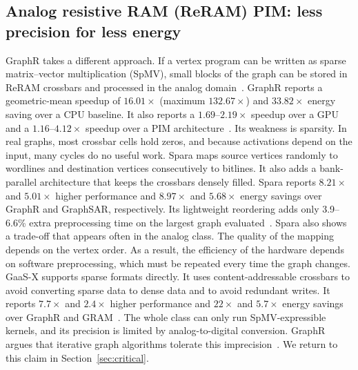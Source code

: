 \documentclass[journal,onecolumn]{IEEEtran}
\begin{document}
\subsection{Analog resistive RAM (ReRAM) PIM: less precision for less energy}
GraphR takes a different approach. If a vertex program can be written as sparse matrix--vector multiplication (SpMV), small blocks of the graph can be stored in ReRAM crossbars and processed in the analog domain~\cite{song2018graphr}. GraphR reports a geometric-mean speedup of $16.01\times$ (maximum $132.67\times$) and $33.82\times$ energy saving over a CPU baseline. It also reports a $1.69$--$2.19\times$ speedup over a GPU and a $1.16$--$4.12\times$ speedup over a PIM architecture~\cite{song2018graphr}. Its weakness is sparsity. In real graphs, most crossbar cells hold zeros, and because activations depend on the input, many cycles do no useful work. Spara maps source vertices randomly to wordlines and destination vertices consecutively to bitlines. It also adds a bank-parallel architecture that keeps the crossbars densely filled. Spara reports $8.21\times$ and $5.01\times$ higher performance and $8.97\times$ and $5.68\times$ energy savings over GraphR and GraphSAR, respectively. Its lightweight reordering adds only 3.9--6.6\% extra preprocessing time on the largest graph evaluated~\cite{zheng2020spara}. Spara also shows a trade-off that appears often in the analog class. The quality of the mapping depends on the vertex order. As a result, the efficiency of the hardware depends on software preprocessing, which must be repeated every time the graph changes. GaaS-X supports sparse formats directly. It uses content-addressable crossbars to avoid converting sparse data to dense data and to avoid redundant writes. It reports $7.7\times$ and $2.4\times$ higher performance and $22\times$ and $5.7\times$ energy savings over GraphR and GRAM~\cite{challapalle2020gaasx}. The whole class can only run SpMV-expressible kernels, and its precision is limited by analog-to-digital conversion. GraphR argues that iterative graph algorithms tolerate this imprecision~\cite{song2018graphr}. We return to this claim in Section~\ref{sec:critical}.
\end{document}

